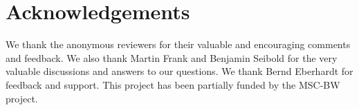 














\vspace{-0.1in}
\section*{Acknowledgements}
\label{sec:acknowledgements}
\vspace{-0.05in}
We thank the anonymous reviewers for their valuable and encouraging comments and feedback. We also thank Martin Frank and Benjamin Seibold for the very valuable discussions and answers to our questions. We thank Bernd Eberhardt for feedback and support. This project has been partially funded by the MSC-BW project.



%







